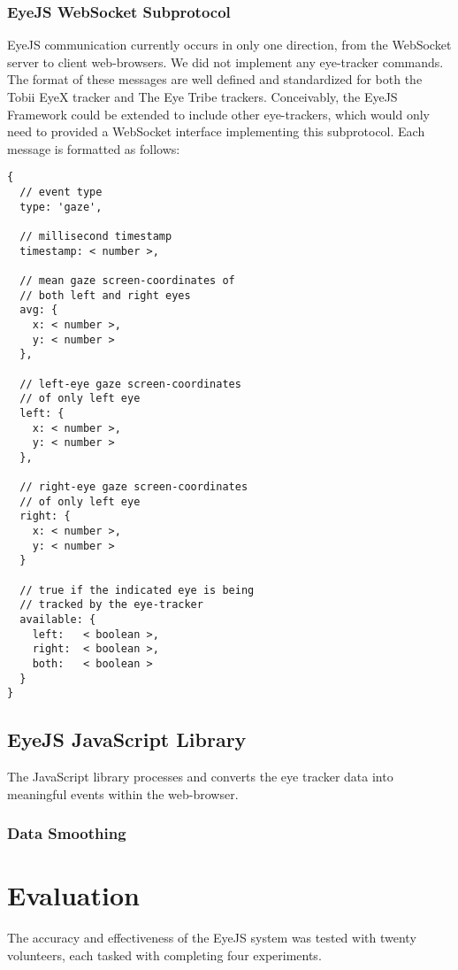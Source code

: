 \documentclass{sigchi}
\begin{document}
\subsubsection{EyeJS WebSocket Subprotocol}
EyeJS communication currently occurs in only one direction, from
the WebSocket server to client web-browsers. We did not implement
any eye-tracker commands. The format of these messages are well
defined and standardized
for both the Tobii EyeX tracker and The Eye Tribe trackers. Conceivably,
the EyeJS Framework could be extended to include other eye-trackers,
which would only need to provided a WebSocket interface implementing
this subprotocol. Each message is formatted as follows:

\begin{lstlisting}
{
  // event type
  type: 'gaze',

  // millisecond timestamp
  timestamp: < number >,

  // mean gaze screen-coordinates of
  // both left and right eyes
  avg: {
    x: < number >,
    y: < number >
  },

  // left-eye gaze screen-coordinates
  // of only left eye
  left: {
    x: < number >,
    y: < number >
  },

  // right-eye gaze screen-coordinates
  // of only left eye
  right: {
    x: < number >,
    y: < number >
  }

  // true if the indicated eye is being
  // tracked by the eye-tracker
  available: {
    left:   < boolean >,
    right:  < boolean >,
    both:   < boolean >
  }
}
\end{lstlisting}


\subsection{EyeJS JavaScript Library}
The JavaScript library processes and converts the eye tracker data
into meaningful events within the web-browser.

\subsubsection{Data Smoothing}

\subsubsection{}



\section{Evaluation}
The accuracy and effectiveness of the EyeJS system was tested with 
twenty volunteers, each tasked with completing four experiments.
\end{document}
